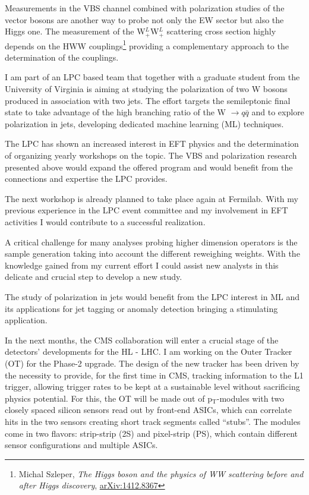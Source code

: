 {\begin{flushleft}
Measurements in the VBS channel combined with polarization studies of the vector bosons are another way to probe not only the EW sector but also the Higgs one.
The measurement of the  W$^L_+$W$^L_+$ scattering cross section highly depends on the HWW couplings\footnote{Michal Szleper, {\em The Higgs boson and the physics of WW scattering before and after Higgs discovery}, \href{https://arxiv.org/pdf/1412.8367}{arXiv:1412.8367}} providing a complementary approach to the determination of the couplings. 

I am part of an LPC based team that together with a graduate student from the University of Virginia is aiming at studying the polarization of two W bosons produced in association with two jets. The effort targets the semileptonic final state to take advantage of the high branching ratio of the W $\to q\bar{q}$ and to explore polarization in jets, developing dedicated machine learning (ML) techniques. 

\vspace{\baselineskip}
 
The LPC has shown an increased interest in EFT physics and the determination of organizing yearly workshops on the topic. The VBS and polarization research presented above would expand the offered program and would benefit from the connections and expertise the LPC provides.

The next workshop is already planned to take place again at Fermilab. With my previous experience in the LPC event committee and my involvement in EFT activities I would contribute to a successful realization. 

A critical challenge for many analyses probing higher dimension operators is the sample generation taking into account the different reweighing weights. With the knowledge gained from my current effort I could assist new analysts in this delicate and crucial step to develop a new study.

The study of polarization in jets would benefit from the LPC interest in ML and its applications for jet tagging or anomaly detection bringing a stimulating application.

\vspace{\baselineskip}

\vspace{\baselineskip}
In the next months, the CMS collaboration will enter a crucial stage of the detectors' developments for the HL - LHC. I am working on the Outer Tracker (OT) for the Phase-2 upgrade.
The design of the new tracker has been driven by the necessity to provide, for the first time in CMS, tracking information to the L1 trigger, allowing trigger rates to be kept at a sustainable level without sacrificing physics potential. For this, the OT will be made out of p$_{\mathrm{T}}$-modules with two closely spaced silicon sensors read out by front-end ASICs, which can correlate hits in the two sensors creating short track segments called ``stubs''. The modules come in two flavors: strip-strip (2S) and pixel-strip (PS), which contain different sensor configurations and multiple ASICs. 


\end{flushleft}}
